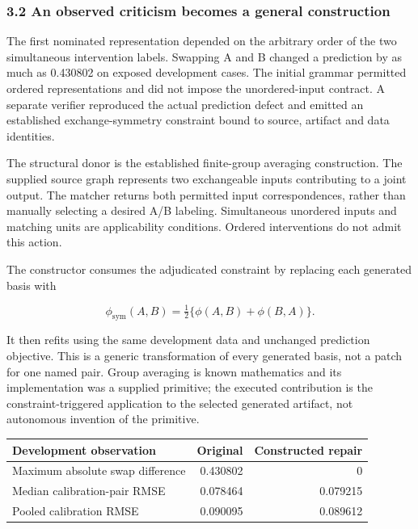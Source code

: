 \documentclass[
  10pt,
]{article}
\begin{document}
\hypertarget{an-observed-criticism-becomes-a-general-construction}{%
\subsubsection{3.2 An observed criticism becomes a general
construction}\label{an-observed-criticism-becomes-a-general-construction}}

The first nominated representation depended on the arbitrary order of
the two simultaneous intervention labels. Swapping A and B changed a
prediction by as much as 0.430802 on exposed development cases. The
initial grammar permitted ordered representations and did not impose the
unordered-input contract. A separate verifier reproduced the actual
prediction defect and emitted an established exchange-symmetry
constraint bound to source, artifact and data identities.

The structural donor is the established finite-group averaging
construction. The supplied source graph represents two exchangeable
inputs contributing to a joint output. The matcher returns both
permitted input correspondences, rather than manually selecting a
desired A/B labeling. Simultaneous unordered inputs and matching units
are applicability conditions. Ordered interventions do not admit this
action.

The constructor consumes the adjudicated constraint by replacing each
generated basis with

\[
\phi_{\mathrm{sym}}(A,B)=\tfrac12\{\phi(A,B)+\phi(B,A)\}.
\]

It then refits using the same development data and unchanged prediction
objective. This is a generic transformation of every generated basis,
not a patch for one named pair. Group averaging is known mathematics and
its implementation was a supplied primitive; the executed contribution
is the constraint-triggered application to the selected generated
artifact, not autonomous invention of the primitive.

\begin{longtable}[]{@{}lrr@{}}
\toprule\noalign{}
Development observation & Original & Constructed repair \\
\midrule\noalign{}
\endhead
\bottomrule\noalign{}
\endlastfoot
Maximum absolute swap difference & 0.430802 & 0 \\
Median calibration-pair RMSE & 0.078464 & 0.079215 \\
Pooled calibration RMSE & 0.090095 & 0.089612 \\
\end{longtable}
\end{document}
